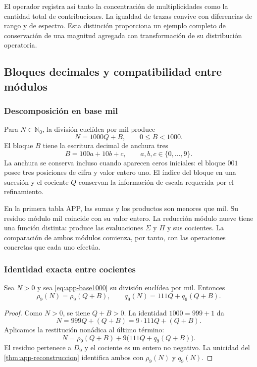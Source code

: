 El operador registra así tanto la concentración de multiplicidades como la cantidad total de contribuciones. La igualdad de trazas convive con diferencias de rango y de espectro. Esta distinción proporciona un ejemplo completo de conservación de una magnitud agregada con transformación de su distribución operatoria.

\subsection{Bloques decimales y compatibilidad entre módulos}
\label{sec:app-base-mil}

\subsubsection{Descomposición en base mil}

Para $N\in\mathbb N_0$, la división euclídea por mil produce
\begin{equation}
 N=1000Q+B,\qquad 0\leq B<1000.
 \label{eq:app-base1000}
\end{equation}
El bloque $B$ tiene la escritura decimal de anchura tres
\[
 B=100a+10b+c,\qquad a,b,c\in\{0,\ldots,9\}.
\]
La anchura se conserva incluso cuando aparecen ceros iniciales: el bloque $001$ posee tres posiciones de cifra y valor entero uno. El índice del bloque en una sucesión y el cociente $Q$ conservan la información de escala requerida por el refinamiento.

En la primera tabla APP, las sumas y los productos son menores que mil. Su residuo módulo mil coincide con su valor entero. La reducción módulo nueve tiene una función distinta: produce las evaluaciones $\Sigma$ y $\Pi$ y sus cocientes. La comparación de ambos módulos comienza, por tanto, con las operaciones concretas que cada uno efectúa.

\subsubsection{Identidad exacta entre cocientes}

\begin{bloqueindivisible}
\begin{teorema}
\label{thm:app-compatibilidad-mil}
Sea $N>0$ y sea \eqref{eq:app-base1000} su división euclídea por mil. Entonces
\begin{equation}
 \rho_9(N)=\rho_9(Q+B),\qquad
 q_9(N)=111Q+q_9(Q+B).
 \label{eq:app-cross-module}
\end{equation}
\end{teorema}

\begin{proof}
Como $N>0$, se tiene $Q+B>0$. La identidad $1000=999+1$ da
\[
 N=999Q+(Q+B)=9\cdot111Q+(Q+B).
\]
Aplicamos la restitución nonádica al último término:
\[
 N=\rho_9(Q+B)+9\bigl(111Q+q_9(Q+B)\bigr).
\]
El residuo pertenece a $D_9$ y el cociente es un entero no negativo. La unicidad del \cref{thm:app-reconstruccion} identifica ambos con $\rho_9(N)$ y $q_9(N)$.
\end{proof}
\end{bloqueindivisible}

